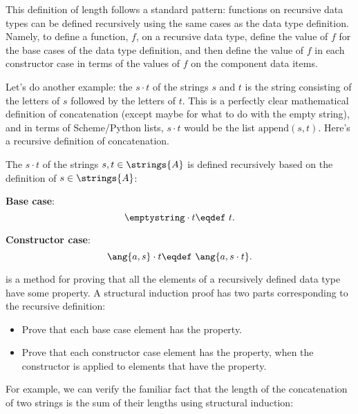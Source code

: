 This definition of length follows a standard pattern: functions on
recursive data types can be defined recursively using the same cases as
the data type definition.  Namely, to define a function, $f$, on a
recursive data type, define the value of $f$ for the base cases of the
data type definition, and then define the value of $f$ in each constructor
case in terms of the values of $f$ on the component data items.

Let's do another example: the  $s\cdot t$ of the
strings $s$ and $t$ is the string consisting of the letters of $s$
followed by the letters of $t$.  This is a perfectly clear mathematical
definition of concatenation (except maybe for what to do with the empty
string), and in terms of Scheme/Python lists, $s\cdot t$ would be the list
$\text{append}(s, t)$.  Here's a recursive definition of concatenation.

\begin{definition}\label{concat_def}
The  $s\cdot t$ of the strings $s,t \in
\strings{A}$ is defined recursively based on the definition of $s \in
\strings{A}$:

\item \textbf{Base case}:     %
\[
\emptystring \cdot t \eqdef\ t.
\]

\item \textbf{Constructor case}: %
\[
\ang{a,s} \cdot t \eqdef\ \ang{a, s \cdot t}.
\]
\end{definition}

 is a method for proving that all the elements
of a recursively defined data type have some property.  A structural
induction proof has two parts corresponding to the recursive definition:
\begin{itemize}
\item Prove that each base case element has the property.
\item Prove that each constructor case element has the property, when
  the constructor is applied to elements that have the property.
\end{itemize}

For example, we can verify the familiar fact that the length of the
concatenation of two strings is the sum of their lengths using structural
induction:

